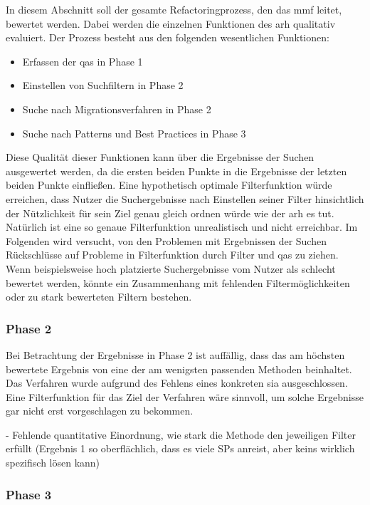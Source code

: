 In diesem Abschnitt soll der gesamte Refactoringprozess, den das \gls{mmf} leitet, bewertet werden.
Dabei werden die einzelnen Funktionen des \gls{arh} qualitativ evaluiert.
Der Prozess besteht aus den folgenden wesentlichen Funktionen:
\begin{itemize}
	\item Erfassen der \glspl{qa} in Phase 1
	\item Einstellen von Suchfiltern in Phase 2
	\item Suche nach Migrationsverfahren in Phase 2
	\item Suche nach Patterns und Best Practices in Phase 3
\end{itemize}

Diese Qualität dieser Funktionen kann über die Ergebnisse der Suchen ausgewertet werden, da die ersten beiden Punkte in die Ergebnisse der letzten beiden Punkte einfließen.
Eine hypothetisch optimale Filterfunktion würde erreichen, dass Nutzer die Suchergebnisse nach Einstellen seiner Filter hinsichtlich der Nützlichkeit für sein Ziel genau gleich ordnen würde wie der \gls{arh} es tut.
Natürlich ist eine so genaue Filterfunktion unrealistisch und nicht erreichbar.
Im Folgenden wird versucht, von den Problemen mit Ergebnissen der Suchen Rückschlüsse auf Probleme in Filterfunktion durch Filter und \glspl{qa} zu ziehen.
Wenn beispielsweise hoch platzierte Suchergebnisse vom Nutzer als schlecht bewertet werden, könnte ein Zusammenhang mit fehlenden Filtermöglichkeiten oder zu stark bewerteten Filtern bestehen.

\subsubsection{Phase 2}

Bei Betrachtung der Ergebnisse in Phase 2 ist auffällig, dass das am höchsten bewertete Ergebnis von  eine der am wenigsten passenden Methoden beinhaltet.
Das Verfahren wurde aufgrund des Fehlens eines konkreten \gls{sia} ausgeschlossen.
Eine Filterfunktion für das Ziel der Verfahren wäre sinnvoll, um solche Ergebnisse gar nicht erst vorgeschlagen zu bekommen.

- Fehlende quantitative Einordnung, wie stark die Methode den jeweiligen Filter erfüllt (Ergebnis 1 so oberflächlich, dass es viele SPs anreist, aber keins wirklich spezifisch lösen kann)

\subsubsection{Phase 3}